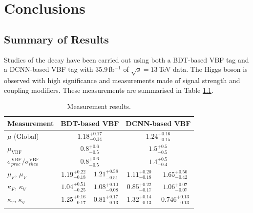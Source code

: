 \chapter{Conclusions}
\label{chap:conclusions}

\section{Summary of Results}
Studies of the \Hgg decay have been carried out using both a BDT-based VBF tag and a DCNN-based VBF tag with 35.9\,fb$^{-1}$ of $\sqrt{s}=13$\,TeV data. 
The Higgs boson is observed with high significance and measurements made of signal strength and coupling modifiers. 
These measurements are summarised in Table \ref{tab:conclusion:measurements}.
\begin{table}[h!]
    \centering
    \renewcommand{\arraystretch}{1.5}
    \begin{tabular}{ l | c c c c}
        \thickhline
        Measurement & \multicolumn{2}{c}{BDT-based VBF}  & \multicolumn{2}{c}{DCNN-based VBF} \\
        \hline
        $\mu$ (Global)                  & \multicolumn{2}{c}{$1.18^{+0.17}_{-0.14}$} & \multicolumn{2}{c}{$1.24^{+0.16}_{-0.15}$} \\
        $\mu_{\mathrm{VBF}} $           & \multicolumn{2}{c}{$0.8^{+0.6}_{-0.5}$} & \multicolumn{2}{c}{$1.5^{+0.5}_{-0.5}$} \\
        $\sigma^{\mathrm{VBF}}_{proc}/\sigma^{\mathrm{VBF}}_{theo}$ & \multicolumn{2}{c}{$0.8^{+0.6}_{-0.5}$} & \multicolumn{2}{c}{$1.4^{+0.5}_{-0.4}$} \\  
        $\mu_F$, $\mu_V$                & $1.19^{+0.22}_{-0.18}$ & $1.21^{+0.58}_{-0.51}$ & $1.11^{+0.20}_{-0.18}$ & $1.65^{+0.50}_{-0.42}$ \\
        $\kappa_F$, $\kappa_V$          & $1.04^{+0.51}_{-0.25}$ & $1.08^{+0.10}_{-0.08}$ & $0.85^{+0.22}_{-0.17}$ & $1.06^{+0.07}_{-0.07}$ \\ 
        $\kappa_{\gamma}$, $\kappa_{g}$ & $1.25^{+0.16}_{-0.17}$ & $0.81^{+0.17}_{-0.13}$ & $1.32^{+0.14}_{-0.13}$ & $0.746^{+0.13}_{-0.13}$ \\ 
        \thickhline
\end{tabular}
    \caption{Measurement results.}
    \label{tab:conclusion:measurements}
\end{table}


